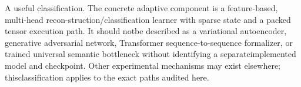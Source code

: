
\noindent
A useful classification. The concrete adaptive component is a feature-based, multi-head recon-\linebreak[4]
struction/classification learner with sparse state and a packed tensor execution path. It should not\linebreak[4]
be described as a variational autoencoder, generative adversarial network, Transformer sequence-\linebreak[4]
to-sequence formalizer, or trained universal semantic bottleneck without identifying a separate\linebreak[4]
implemented model and checkpoint. Other experimental mechanisms may exist elsewhere; this\linebreak[4]
classification applies to the exact paths audited here.\par

